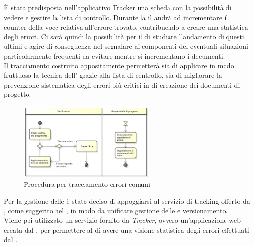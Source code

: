 				\label{sec:tracciamento}
					È stata predisposta nell'applicativo Tracker una scheda con la possibilità di vedere e gestire la lista di controllo. Durante la  il  andrà ad incrementare il counter della voce relativa all'errore trovato, contribuendo a creare una statistica degli errori. Ci sarà quindi la possibilità per il  di studiare l'andamento di questi ultimi e agire di conseguenza nel segnalare ai componenti del  eventuali situazioni particolarmente frequenti da evitare mentre si incrementano i documenti.\\ Il tracciamento costruito appositamente permetterà sia di applicare in modo fruttuoso la tecnica dell'\textit{} grazie alla lista di controllo, sia di migliorare la prevenzione sistematica degli errori più critici in  di creazione dei documenti di progetto.
					\begin{figure}[H]
							\centering
							\includegraphics[width=0.6\textwidth]{NormeDiProgetto/Pics/ProceduraDecrementoErrori}
							\caption{Procedura per tracciamento errori comuni}
					\end{figure}
			Per la gestione delle  è stato deciso di appoggiarsi al servizio di  tracking offerto da , come suggerito nel , in modo da unificare gestione delle  e versionamento. \\
			Viene poi utilizzato un servizio fornito da \textit{Tracker}, ovvero un'applicazione web creata dal \groupname, per permettere al  di avere una visione statistica degli errori effettuati dal .
